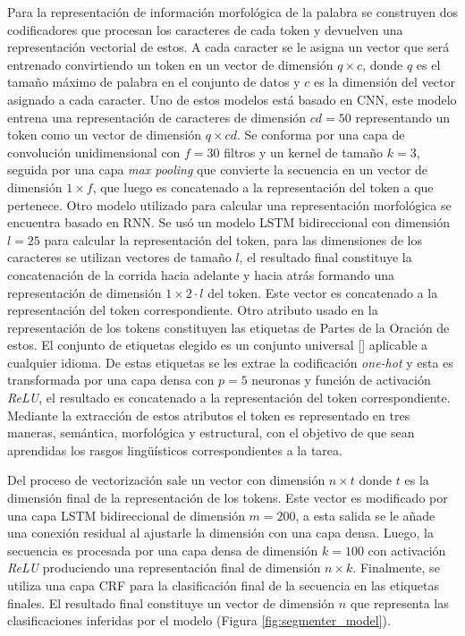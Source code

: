 \documentclass[a4paper,11pt,twocolumn,twoside]{article}
\begin{document}
Para la representación de información morfológica de la palabra se construyen dos
codificadores que procesan los caracteres de cada token y devuelven una representación vectorial de estos.
A cada caracter se le asigna un vector que será entrenado convirtiendo un token en un vector de dimensión
$q \times c$, donde $q$ es el tamaño máximo de palabra en el conjunto de datos y $c$ es la dimensión del vector
asignado a cada caracter.
Uno de estos modelos está basado en CNN, este modelo entrena una representación de caracteres de dimensión
$cd=50$ representando un token como un vector de dimensión $q \times cd$. Se conforma por una capa de convolución unidimensional
con $f=30$ filtros y un kernel de tamaño $k=3$, seguida por una capa \textit{max pooling} que convierte la secuencia en un vector
de dimensión $1 \times f$, que luego es concatenado a la representación del token a que pertenece.
Otro modelo utilizado para calcular una representación morfológica se encuentra basado en RNN. Se usó
un modelo LSTM bidireccional con dimensión $l=25$ para calcular la representación del token, para las dimensiones de los caracteres se
utilizan vectores de tamaño $l$, el resultado final constituye la concatenación de la corrida hacia adelante y
hacia atrás formando una representación de dimensión $1 \times 2 \cdot l$ del token. Este vector es concatenado a la representación
del token correspondiente. Otro atributo usado en la representación de los tokens constituyen las etiquetas de 
Partes de la Oración de estos.
El conjunto de etiquetas elegido es un conjunto universal [\cite{petrov2011universal}] aplicable a cualquier idioma.
De estas etiquetas se les extrae la codificación \textit{one-hot} y esta es transformada por una capa densa con $p=5$ neuronas
y función de activación \textit{ReLU}, el resultado es concatenado a la representación del token correspondiente. Mediante 
la extracción de estos atributos el token es representado en tres maneras, semántica, morfológica y estructural, con el 
objetivo de que sean aprendidas los rasgos lingüísticos correspondientes a la tarea.

Del proceso de vectorización sale un vector con dimensión $n \times t$ donde $t$ es la dimensión final de la representación
de los tokens. Este vector es modificado por una capa LSTM bidireccional de dimensión $m=200$, a esta salida se le 
añade una conexión residual al ajustarle la dimensión con una capa densa. Luego, la secuencia es procesada por una 
capa densa de dimensión $k=100$ con activación \textit{ReLU} produciendo una representación final de dimensión 
$n \times k$. Finalmente, se utiliza una capa CRF
para la clasificación final de la secuencia en las etiquetas finales. El resultado final constituye un vector
de dimensión $n$ que representa las clasificaciones inferidas por el modelo (Figura \ref{fig:segmenter_model}).
\end{document}
